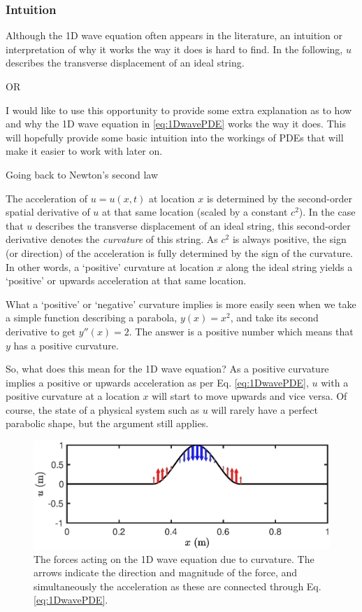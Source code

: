 \subsubsection{Intuition}
Although the 1D wave equation often appears in the literature, an intuition or interpretation of why it works the way it does is hard to find. In the following, $u$ describes the transverse displacement of an ideal string.

OR 

I would like to use this opportunity to provide some extra explanation as to how and why the 1D wave equation in \eqref{eq:1DwavePDE} works the way it does. This will hopefully provide some basic intuition into the workings of PDEs that will make it easier to work with later on. \SWcomment[somethingsomething]

Going back to Newton's second law

The acceleration of $u = u(x,t)$ at location $x$ is determined by the second-order spatial derivative of $u$ at that same location (scaled by a constant $c^2$). In the case that $u$ describes the transverse displacement of an ideal string, this second-order derivative denotes the \textit{curvature} of this string. As $c^2$ is always positive, the sign (or direction) of the acceleration is fully determined by the sign of the curvature. In other words, a `positive' curvature at location $x$ along the ideal string yields a `positive' or upwards acceleration at that same location. 

What a `positive' or `negative' curvature implies is more easily seen when we take a simple function describing a parabola, $y(x) = x^2$, and take its second derivative to get $y''(x) = 2$. The answer is a positive number which means that $y$ has a positive curvature. 

So, what does this mean for the 1D wave equation? As a positive curvature implies a positive or upwards acceleration as per Eq. \eqref{eq:1DwavePDE}, $u$ with a positive curvature at a location $x$ will start to move upwards and vice versa. Of course, the state of a physical system such as $u$ will rarely have a perfect parabolic shape, but the argument still applies. 

\begin{figure}[h]
    \centering
    \includegraphics[width=\textwidth]{figures/resonators/curvature.eps}
    \caption{\label{fig:curvature} The forces acting on the 1D wave equation due to curvature. The arrows indicate the direction and magnitude of the force, and simultaneously the acceleration as these are connected through Eq. \eqref{eq:1DwavePDE}.}
\end{figure}

